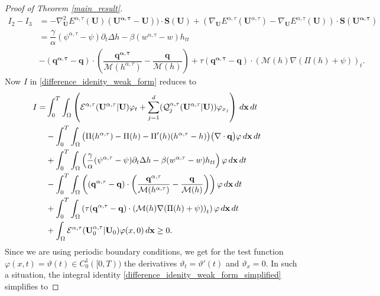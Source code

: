 \documentclass[11pt]{article}
\numberwithin{equation}{section}
\newtheorem{counter example}[theorem]{Counter Example}
\numberwithin{equation}{section}
\numberwithin{equation}{section}
\newcommand{\rel}{^{\alpha, \tau}}
\begin{document}
\begin{proof}[Proof of Theorem \ref{main_result}]
\begin{equation}
\begin{aligned}
        I_2-I_3&=-\nabla^2_{\mathbf{U}}E^{\alpha, \tau}(\mathbf{{U}})(\mathbf{U\rel}-\mathbf{{U}}))\cdot \mathbf{{S}({U})}+\left(\nabla_{\mathbf{U}}E^{\alpha, \tau}(\mathbf{U}\rel)-\nabla_{\mathbf{U}}E^{\alpha, \tau}(\mathbf{{U}})\right)\cdot \mathbf{S(U\rel)}\\
        &=\dfrac{\gamma}{\alpha} (\psi\rel-{\psi})\partial_t\Delta{h}-\beta (w\rel-{w}){h}_{tt}\\
   &-(\mathbf{q\rel-{q}})\cdot \left(\dfrac{\mathbf{{q\rel}}}{\mathcal{M}(h\rel)}-\dfrac{\mathbf{{q}}}{\mathcal{M}({h})}\right)+\tau (\mathbf{q\rel-{q}})\cdot \left(\mathcal{M}({h})\nabla(\Pi({h})+{\psi})\right)_t.
    \end{aligned}
\end{equation}
Now $I$ in \eqref{difference_idenity_weak_form} reduces to  
\begin{equation}\label{difference_idenity_weak_form_simplified}
\begin{aligned}
\hspace*{-1cm}I=&    \int_{0}^{T}\int_{\Omega} \left(\mathcal{E}^{\alpha, \tau}(\mathbf{U}\rel|\mathbf{{U}})\varphi_t+\sum_{j=1}^{d}(\mathcal{Q}^{\alpha, \tau}_j(\mathbf{U}\rel|\mathbf{{U}}))\varphi_{x_j}\right) \, d\mathbf{x}\, dt\\
&-\int_{0}^{T}\int_{\Omega} \big(\Pi(h\rel)-\Pi({h})-\Pi'({h})(h\rel-{h})\big)
     \big(\nabla\cdot \mathbf{q}\big)\varphi\, d\mathbf{x}\, dt\\
&+\int_{0}^{T}\int_{\Omega}\left(\dfrac{\gamma}{\alpha} (\psi\rel-{\psi})\partial_t\Delta{h}-\beta (w\rel-{w}){h}_{tt}\right)\varphi\, d\mathbf{x}\, dt\\
&-\int_{0}^{T}\int_{\Omega}\left((\mathbf{q\rel-{q}})\cdot \left(\dfrac{\mathbf{{q\rel}}}{\mathcal{M}(h\rel)}-\dfrac{\mathbf{{q}}}{\mathcal{M}({h})}\right)\right)\varphi\, d\mathbf{x}\, dt\\
   &+\int_{0}^{T}\int_{\Omega}\left(\tau (\mathbf{q\rel-{q}})\cdot \left(\mathcal{M}({h})\nabla(\Pi({h})+{\psi})\right)_t\right)\varphi\, d\mathbf{x}\, dt\\
   &+\int_{\Omega} \mathcal{E}^{\alpha, \tau}(\mathbf{U}_0\rel|\mathbf{{U}}_0)\varphi(x,0)\, d\mathbf{x}\geq 0. 
\end{aligned}
\end{equation}
Since we are using periodic boundary conditions, we get for the test function $\varphi(x,t)=\vartheta(t)\in C_{0}^{1}([0, T))$ the derivatives  $\vartheta_t=\vartheta'(t)$ and $\vartheta_x=0$. In such a situation, the integral identity \eqref{difference_idenity_weak_form_simplified} simplifies to

\end{proof}
\end{document}
